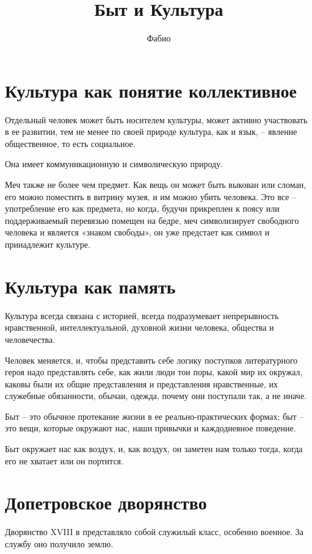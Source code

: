 \documentclass[12pt,a4paper]{article}
\author{Фабио}
\title{Быт и Культура}
\begin{document}
\maketitle %

\tableofcontents %
\newpage

\section{Культура как понятие коллективное}

Отдельный человек может быть носителем культуры, может
активно участвовать в ее развитии, тем не менее по своей
природе культура, как и язык, – явление общественное, то
есть социальное.

Она имеет коммуникационную и символическую природу.

Меч также не более чем предмет. Как вещь он может
быть выкован или сломан, его можно поместить в витрину
музея, и им можно убить человека. Это все – употребление
его как предмета, но когда, будучи прикреплен к поясу или
поддерживаемый перевязью помещен на бедре, меч
символизирует свободного человека и является «знаком
свободы», он уже предстает как символ и принадлежит
культуре.

\section{Культура как память}
Культура всегда связана с историей, всегда подразумевает непрерывность
нравственной, интеллектуальной, духовной жизни человека,
общества и человечества.
 
Человек меняется, и, чтобы представить себе логику
поступков литературного героя надо представлять себе, как жили люди тои поры, какой мир их окружал, каковы были их общие
представления и представления нравственные, их
служебные обязанности, обычаи, одежда, почему они поступали так, а не иначе.
 
Быт – это обычное протекание жизни в ее
реально-практических формах; быт – это вещи, которые
окружают нас, наши привычки и каждодневное поведение.

Быт окружает нас как воздух, и, как воздух, он заметен нам только тогда, когда его не хватает или он портится.
\section{Допетровское дворянство}
Дворянство XVIII в представляло собой служилый класс, особенно военное.
За службу оно  получило  землю.
  
\end{document}
